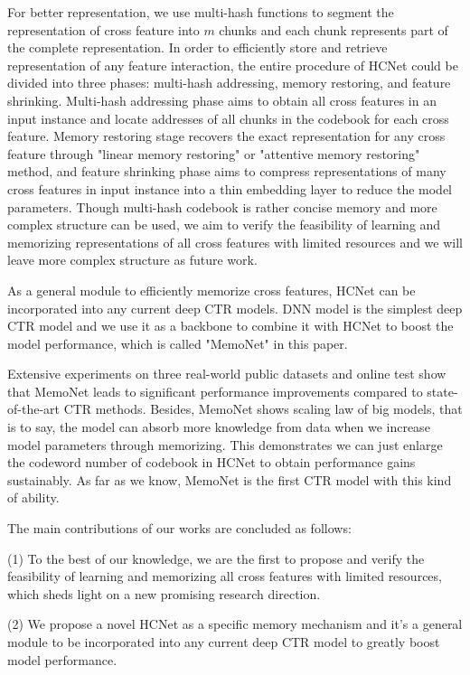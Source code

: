 \documentclass[sigconf,authorversion]{acmart}
\begin{document}
For better representation, we use multi-hash functions to segment the representation of cross feature into  $m$ chunks and each chunk represents part of the complete representation.  In order to efficiently store and retrieve representation of any feature interaction, the entire procedure of HCNet could be divided into three phases: multi-hash addressing, memory restoring, and feature shrinking. Multi-hash addressing phase aims to obtain all cross features in an input instance and locate addresses of all chunks in the codebook for each cross feature. Memory restoring stage recovers the exact representation for any cross feature through "linear memory restoring" or "attentive memory restoring" method, and feature shrinking phase aims to compress representations of many cross features in input instance into a thin embedding layer to reduce the model parameters. Though multi-hash codebook is rather concise memory and more complex structure can be used, we aim to verify the feasibility of learning and memorizing representations of all cross features with limited resources and we will leave more complex structure as future work.

As a general module to efficiently memorize cross features, HCNet can be incorporated into any current deep CTR models. DNN model is the simplest deep CTR model and we use it as a backbone to combine it with HCNet to boost the model performance, which is  called  "MemoNet" in this paper.

Extensive experiments on three real-world public datasets and online test show that MemoNet leads to significant performance improvements compared to state-of-the-art CTR methods. Besides, MemoNet shows scaling law of big models, that is to say, the model can absorb more knowledge from data when we increase model parameters through memorizing. This demonstrates we can just enlarge the codeword number of codebook in HCNet to obtain performance gains sustainably. As far as we know, MemoNet is the first CTR model with this kind of ability.

The main contributions of our works are concluded as follows:

(1) To the best of our knowledge, we are the first to propose and verify the feasibility of learning and memorizing all cross features  with limited resources, which sheds light on a new promising research direction.

(2) We propose a novel HCNet as a specific memory mechanism and it's a general module to be incorporated into any current
deep CTR model to greatly boost model performance.
\end{document}
